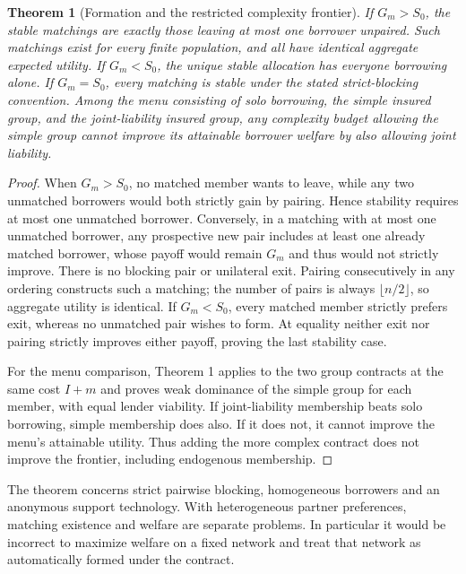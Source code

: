 \documentclass[11pt]{article}
\newtheorem{theorem}{Theorem}
\theoremstyle{remark}
\begin{document}
\begin{theorem}[Formation and the restricted complexity frontier]
If $G_m>S_0$, the stable matchings are exactly those leaving at most one
borrower unpaired. Such matchings exist for every finite population, and
all have identical aggregate expected utility. If $G_m<S_0$, the unique
stable allocation has everyone borrowing alone. If $G_m=S_0$, every
matching is stable under the stated strict-blocking convention.
Among the menu consisting of solo borrowing, the simple insured group,
and the joint-liability insured group, any complexity budget allowing the
simple group cannot improve its attainable borrower welfare by also
allowing joint liability.
\end{theorem}
\begin{proof}
When $G_m>S_0$, no matched member wants to leave, while any two unmatched
borrowers would both strictly gain by pairing. Hence stability requires
at most one unmatched borrower. Conversely, in a matching with at most
one unmatched borrower, any prospective new pair includes at least one
already matched borrower, whose payoff would remain $G_m$ and thus would
not strictly improve. There is no blocking pair or unilateral exit.
Pairing consecutively in any ordering constructs such a matching; the
number of pairs is always $\lfloor n/2\rfloor$, so aggregate utility is
identical. If $G_m<S_0$, every matched member strictly prefers exit,
whereas no unmatched pair wishes to form. At equality neither exit nor
pairing strictly improves either payoff, proving the last stability case.

For the menu comparison, Theorem 1 applies to the two group contracts at
the same cost $I+m$ and proves weak dominance of the simple group for
each member, with equal lender viability. If joint-liability membership
beats solo borrowing, simple membership does also. If it does not, it
cannot improve the menu's attainable utility. Thus adding the more complex
contract does not improve the frontier, including endogenous membership.
\end{proof}

The theorem concerns strict pairwise blocking, homogeneous borrowers and
an anonymous support technology. With heterogeneous partner preferences,
matching existence and welfare are separate problems. In particular it
would be incorrect to maximize welfare on a fixed network and treat that
network as automatically formed under the contract.
\end{document}
